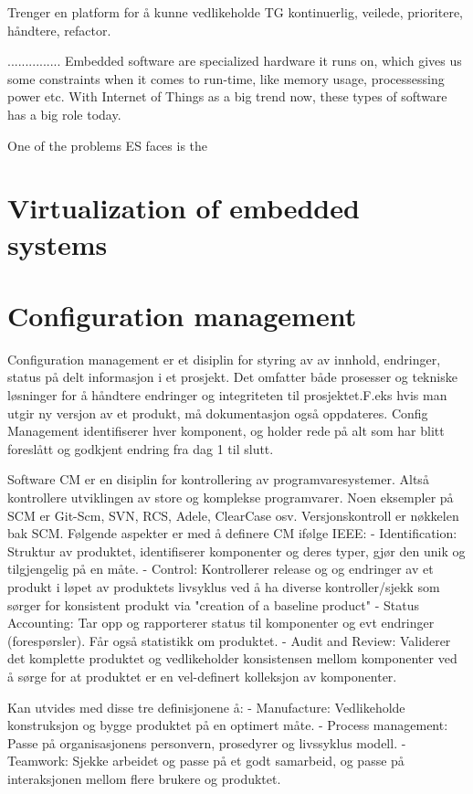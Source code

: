 Trenger en platform for å kunne vedlikeholde TG kontinuerlig, veilede, prioritere, håndtere, refactor.


...............
Embedded software are specialized hardware it runs on, which gives us some constraints when it comes to run-time, like memory usage, processessing power etc. With Internet of Things as a big trend now, these types of software has a big role today. 

One of the problems ES faces is the 

\section{Virtualization of embedded systems}


\section{Configuration management}
Configuration management er et disiplin for styring av av innhold, endringer, status på delt informasjon i et prosjekt. Det omfatter både prosesser og tekniske løsninger for å håndtere endringer og integriteten til prosjektet.F.eks hvis man utgir ny versjon av et produkt, må dokumentasjon også oppdateres. Config Management identifiserer hver komponent, og holder rede på alt som har blitt foreslått og godkjent endring fra dag 1 til slutt.

Software CM er en disiplin for kontrollering av programvaresystemer. Altså kontrollere utviklingen av store og komplekse programvarer. Noen eksempler på SCM er Git-Scm, SVN, RCS, Adele, ClearCase osv. Versjonskontroll er nøkkelen bak SCM. Følgende aspekter er med å definere CM ifølge IEEE:
-	Identification: Struktur av produktet, identifiserer komponenter og deres typer, gjør den unik og tilgjengelig på en måte.
-	Control: Kontrollerer release og og endringer av et produkt i løpet av produktets livsyklus ved å ha diverse kontroller/sjekk som sørger for konsistent produkt via "creation of a baseline product"
-	Status Accounting: Tar opp og rapporterer status til komponenter og evt endringer (forespørsler). Får også  statistikk om produktet.
-	Audit and Review: Validerer det komplette produktet og vedlikeholder konsistensen mellom komponenter ved å sørge for at produktet er en vel-definert kolleksjon av komponenter.

Kan utvides med disse tre definisjonene å:
-	Manufacture: Vedlikeholde konstruksjon og bygge produktet på en optimert måte. 
-	Process management: Passe på organisasjonens personvern, prosedyrer og livssyklus modell.
-	Teamwork: Sjekke arbeidet og passe på et godt samarbeid, og passe på interaksjonen mellom flere brukere og produktet.

